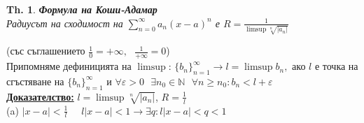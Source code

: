 \documentclass[12pt]{article}
\newtheorem{theorem}{Th.}
\newcommand{\spc}{\text{ }}
\begin{document}
	\begin{theorem}
		\textbf{Формула на Коши-Адамар}\\
		Радиусът на сходимост на $\sum_{n=0}^{\infty}a_n(x-a)^n$ е $R = \frac{1}{\limsup\sqrt[n]{\mathbf{|}a_n\mathbf{|}}}$
	\end{theorem}
	(със съглашението $\textstyle\frac{1}{0}=+\infty,\spc\frac{1}{+\infty}=0$)\\
	Припомняме дефиницията на $\limsup$: $\{b_n\}_{n=1}^{\infty}\rightarrow l = \limsup b_n,$ ако $l$ е точка на сгъстяване на $\{b_n\}_{n=1}^{\infty}$ и $\forall \varepsilon > 0 \spc\exists n_0 \in \mathbb{N} \spc\forall n \geq n_0 : b_n < l + \varepsilon$\\
	
	\textbf{\underline{Доказателство:}} $l = \limsup\sqrt[n]{|a_n|}$, $R = \frac{1}{l}$\\
	(a) $|x-a|<\frac{1}{l}$ $\quad l|x-a|<1\rightarrow \exists q : l|x-a|<q<1$
\end{document}
